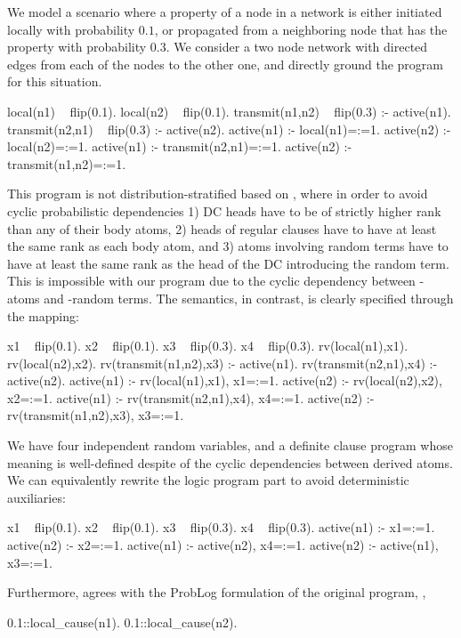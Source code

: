 \begin{example}
	We model a scenario where a property of a node in a network is either initiated locally with probability $0.1$, or propagated from a neighboring node that has the property with probability $0.3$. We consider a two node network with directed edges from each of the nodes to the other one, and directly ground the program for this situation.
	\begin{problog}
local(n1) ~ flip(0.1).
local(n2) ~ flip(0.1).
transmit(n1,n2) ~ flip(0.3) :- active(n1).
transmit(n2,n1) ~ flip(0.3) :- active(n2).
active(n1) :- local(n1)=:=1.
active(n2) :- local(n2)=:=1.
active(n1) :- transmit(n2,n1)=:=1.
active(n2) :- transmit(n1,n2)=:=1.
	\end{problog}
	This program is not distribution-stratified based on \citep{gutmann2011magic}, where in order to avoid cyclic probabilistic dependencies 1) DC heads have to be of strictly higher rank than any of their body atoms, 2) heads of regular clauses have to have at least the same rank as each body atom, and 3) atoms involving random terms have to have at least the same rank as the head of the DC introducing the random term. This is impossible with our program due to the cyclic dependency between -atoms and -random terms. The \dcproblogsty semantics, in contrast,  is clearly specified through the mapping:
	\begin{problog}
x1 ~ flip(0.1).
x2 ~ flip(0.1).
x3 ~ flip(0.3).
x4 ~ flip(0.3).
rv(local(n1),x1).
rv(local(n2),x2).
rv(transmit(n1,n2),x3) :- active(n1).
rv(transmit(n2,n1),x4) :- active(n2).
active(n1) :- rv(local(n1),x1), x1=:=1.
active(n2) :- rv(local(n2),x2), x2=:=1.
active(n1) :- rv(transmit(n2,n1),x4), x4=:=1.
active(n2) :- rv(transmit(n1,n2),x3), x3=:=1.
	\end{problog}
	We have four independent random variables, and a definite clause program whose meaning is well-defined despite of the cyclic dependencies between derived atoms. We can equivalently rewrite the logic program part to avoid deterministic auxiliaries:
	\begin{problog}
x1 ~ flip(0.1).
x2 ~ flip(0.1).
x3 ~ flip(0.3).
x4 ~ flip(0.3).
active(n1) :- x1=:=1.
active(n2) :- x2=:=1.
active(n1) :- active(n2), x4=:=1.
active(n2) :- active(n1), x3=:=1.
	\end{problog}
	Furthermore, \dcproblogsty agrees with the ProbLog formulation of the original program, \ie,
	\begin{problog}
0.1::local_cause(n1).
0.1::local_cause(n2).

\end{problog}
\end{example}
